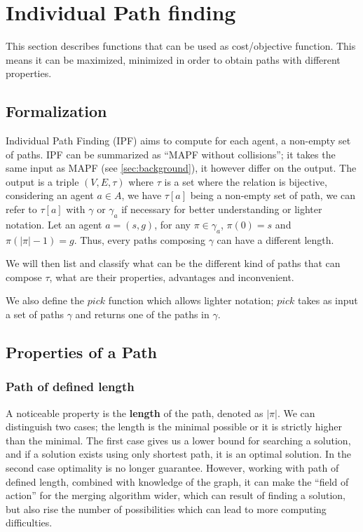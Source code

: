 
\section{Individual Path finding}\label{sec:ipf}
This section describes functions that can be used as cost/objective function. This means it can be maximized, minimized in order to obtain paths with different properties.

\subsection{Formalization}

Individual Path Finding (IPF) aims to compute for each agent, a non-empty set of paths. IPF can be summarized as ``MAPF without collisions''; it takes the same input as MAPF (see \ref{sec:background}), it however differ on the output. The output is a triple \((V,E,\tau)\) where \(\tau\) is a set where the relation is bijective, considering an agent \(a \in A\), we have  \(\tau[a]\) being a non-empty set of path, we can refer to \(\tau[a]\) with \(\gamma\) or \(\gamma_a\) if necessary for better understanding or lighter notation. Let an agent \(a=(s,g)\), for any \(\pi\in \gamma_a\), \(\pi(0) = s\) and \(\pi(|\pi|-1) = g\). Thus, every paths composing \(\gamma\) can have a different length.


We will then list and classify what can be the different kind of paths that can compose \(\tau\), what are their properties, advantages and inconvenient.


We also define the \(pick\) function which allows lighter notation; \(pick\) takes as input a set of paths \(\gamma\) and returns one of the paths in \(\gamma\).




\subsection{Properties of a Path}

\subsubsection{Path of defined length}
A noticeable property is the \textbf{length} of the path, denoted as \(|\pi|\). We can distinguish two cases; the length is the minimal possible or it is strictly higher than the minimal. The first case gives us a lower bound for searching a solution, and if a solution exists using only shortest path, it is an optimal solution. In the second case optimality is no longer guarantee. However, working with path of defined length, combined with knowledge of the graph, it can make the ``field of action'' for the merging algorithm wider, which can result of finding a solution, but also rise the number of possibilities which can lead to more computing difficulties.


